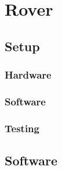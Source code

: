 \section{Rover}



\subsection{Setup}
\subsubsection{Hardware}
\subsubsection{Software}
\subsubsection{Testing}


\subsection{Software}








